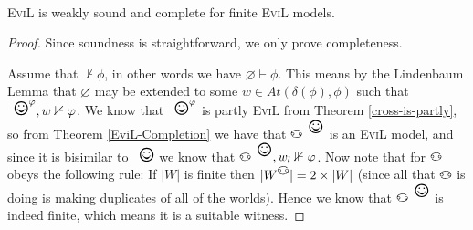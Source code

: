 \begin{theorem}\label{abst-finite-completeness}\ 
\begin{center}
\textsc{EviL} is weakly sound and complete for finite \textsc{EviL}
models.
\end{center}
\end{theorem}
\begin{proof}
Since soundness is straightforward, we only prove completeness.

Assume that $\nvdash \phi$, in other words we have $\varnothing \vdash
\phi$.  This means by the Lindenbaum Lemma that $\varnothing$ may be
extended to some $w \in At(\delta(\phi),\phi)$ such that 
$\Cross^\phi,w\nVdash \phi$.  We know that $\Cross^\phi$ is partly
\textsc{EviL} from Theorem \ref{cross-is-partly}, so from Theorem
\ref{EviL-Completion} we have that $\invis^\Cross$ is an \textsc{EviL}
model, and since it is bisimilar to $\Cross$ we know that
$\invis^\Cross, w_l \nVdash \phi$.
Now note that for $\invis$ obeys the following rule:  If $|W|$ is
finite then $|W^\invis| = 2 \times |W|$ (since all that $\invis$ is
doing is making duplicates of all of the worlds).  Hence we know that
$\invis^\Cross$ is indeed finite, which means it is a suitable witness.
\end{proof}

